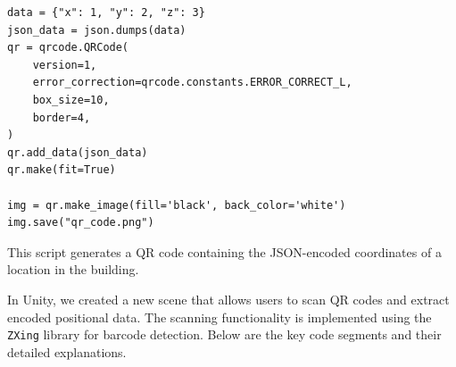 \begin{lstlisting}[language=cSharp]
data = {"x": 1, "y": 2, "z": 3}
json_data = json.dumps(data)
qr = qrcode.QRCode(
    version=1,
    error_correction=qrcode.constants.ERROR_CORRECT_L,
    box_size=10,
    border=4,
)
qr.add_data(json_data)
qr.make(fit=True)

img = qr.make_image(fill='black', back_color='white')
img.save("qr_code.png")
\end{lstlisting}

This script generates a QR code containing the JSON-encoded coordinates of a location in the building.

In Unity, we created a new scene that allows users to scan QR codes and extract encoded positional data. The scanning functionality is implemented using the \texttt{ZXing} library for barcode detection. Below are the key code segments and their detailed explanations.

